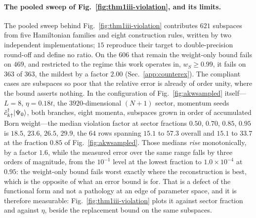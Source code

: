 \paragraph{The pooled sweep of Fig.~\ref{fig:thm1iii-violation}, and its limits.}
The pooled sweep behind Fig.~\ref{fig:thm1iii-violation} contributes $621$ subspaces from five Hamiltonian families and eight construction rules, written by two independent implementations; $15$
reproduce their target to double-precision round-off and define no ratio. On the $606$ that remain the
weight-only bound fails on $469$, and restricted to the regime this work operates in, $w_S\ge0.99$, it fails
on $363$ of $363$, the mildest by a factor $2.00$ (Sec.~\ref{app:counterex}). The compliant cases are
subspaces so poor that the relative error is already of order unity, where the bound asserts nothing.
In the configuration of Fig.~\ref{fig:akwsampled} itself---$L=8$, $\eta=0.18t$, the $3920$-dimensional
$(N{+}1)$ sector, momentum seeds $\hat c^{\dagger}_{k\uparrow}\lvert \Psi_0 \rangle$, both branches, eight
momenta, subspaces grown in order of accumulated Born weight---the median violation factor at sector
fractions $0.50$, $0.70$, $0.85$, $0.95$ is $18.5$, $23.6$, $26.5$, $29.9$, the $64$ rows spanning
$15.1$ to $57.3$ overall and $15.1$ to $33.7$ at the fraction $0.85$ of Fig.~\ref{fig:akwsampled}. Those medians
\emph{rise} monotonically, by a factor $1.6$, while the measured error over the same range falls by
three orders of magnitude, from the $10^{-1}$ level at the lowest fraction to $1.0\times10^{-4}$ at
$0.95$: the weight-only bound fails worst exactly where the reconstruction is best, which is the opposite
of what an error bound is for. That is a defect of the functional form and not a pathology at an edge of
parameter space, and it is therefore measurable: Fig.~\ref{fig:thm1iii-violation} plots it against
sector fraction and against $\eta$, beside the replacement bound on the same subspaces.


